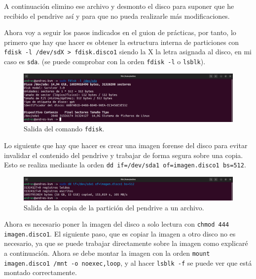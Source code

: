 \documentclass{article}
\begin{document}
A continuación elimino ese archivo y desmonto el disco para suponer que he recibido el pendrive así y para que no pueda realizarle más modificaciones.

\bigskip

Ahora voy a seguir los pasos indicados en el guion de prácticas, por tanto, lo primero que hay que hacer es obtener la estructura interna de particiones con \verb|fdisk -l /dev/sdX > fdisk.disco1| siendo la X la letra asignada al disco, en mi caso es \verb|sda|. (se puede comprobar con la orden \verb|fdisk -l| o \verb|lsblk|).

\begin{figure}[H]
    \centering
    \includegraphics[width=\textwidth]{imagenes/Captura desde 2022-12-03 21-28-00.png}
    \caption{Salida del comando \texttt{fdisk}.}
\end{figure}

\newpage

Lo siguiente que hay que hacer es crear una imagen forense del disco para evitar invalidar el contenido del pendrive y trabajar de forma segura sobre una copia. Esto se realiza mediante la orden \verb|dd if=/dev/sda1 of=imagen.disco1 bs=512|.

\begin{figure}[H]
    \centering
    \includegraphics[width=\textwidth]{imagenes/Captura desde 2022-12-03 21-31-25.png}
    \caption{Salida de la copia de la partición del pendrive a un archivo.}
\end{figure}

Ahora es necesario poner la imagen del disco a solo lectura con \verb|chmod 444 imagen.disco1|. El siguiente paso, que es copiar la imagen a otro disco no es necesario, ya que se puede trabajar directamente sobre la imagen como explicaré a continuación. Ahora se debe montar la imagen con la orden \verb|mount imagen.disco1 /mnt -o noexec,loop|, y al hacer \verb|lsblk -f| se puede ver que está montado correctamente.
\end{document}
